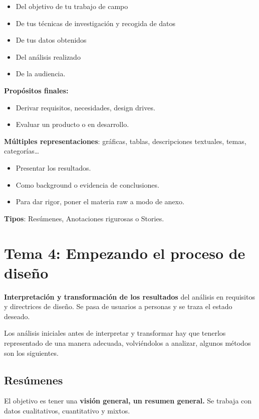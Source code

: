 \documentclass[12pt]{report} %
\begin{document}
\begin{itemize}
\item
  Del objetivo de tu trabajo de campo
\item
  De tus técnicas de investigación y recogida de datos
\item
  De tus datos obtenidos
\item
  Del análisis realizado
\item
  De la audiencia.
\end{itemize}

\textbf{Propósitos finales:}

\begin{itemize}
\item
  Derivar requisitos, necesidades, design drives.
\item
  Evaluar un producto o en desarrollo.
\end{itemize}

\textbf{Múltiples representaciones}: gráficas, tablas, descripciones
textuales, temas, categorías\ldots{}

\begin{itemize}
\item
  Presentar los resultados.
\item
  Como background o evidencia de conclusiones.
\item
  Para dar rigor, poner el materia raw a modo de anexo.
\end{itemize}

\textbf{Tipos}: Resúmenes, Anotaciones rigurosas o Stories.

\chapter{Tema 4: Empezando el proceso de
diseño}

\textbf{Interpretación y transformación de los resultados} del análisis
en requisitos y directrices de diseño. Se pasa de usuarios a personas y
se traza el estado deseado.

Los análisis iniciales antes de interpretar y transformar hay que
tenerlos representado de una manera adecuada, volviéndolos a analizar,
algunos métodos son los siguientes.

\section{Resúmenes}

El objetivo es tener una \textbf{visión general, un resumen general.} Se
trabaja con datos cualitativos, cuantitativo y mixtos.
\end{document}
